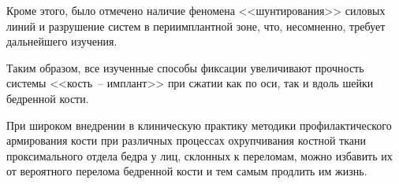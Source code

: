 Кроме этого, было отмечено наличие феномена <<шунтирования>> силовых линий и разрушение систем в периимплантной зоне, что, несомненно, требует дальнейшего изучения.





\smallskip




Таким образом, все изученные способы фиксации увеличивают прочность системы <<кость~-- имплант>>  при сжатии как по оси, так и вдоль шейки бедренной кости. 

При широком внедрении в клиническую практику методики профилактического армирования кости при различных процессах охрупчивания костной ткани проксимального отдела бедра у лиц, склонных к переломам, можно избавить их от вероятного перелома бедренной кости и тем самым продлить им жизнь.







